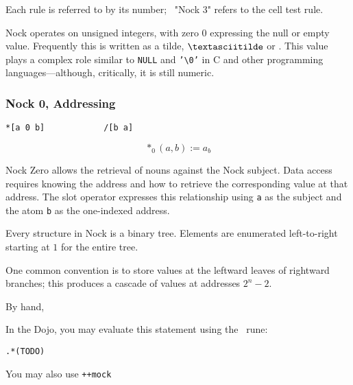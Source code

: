 Each rule is referred to by its number; \eg~"Nock 3" refers to the cell test rule.

Nock operates on unsigned integers, with zero $0$ expressing the null or empty value.  Frequently this is written as a tilde, $\textasciitilde$ or \nullchr.  This value plays a complex role similar to \texttt{NULL} and \texttt{'\textbackslash 0'} in C and other programming languages—although, critically, it is still numeric.

\subsubsection[Nock 0]{Nock 0, Addressing}

\begin{lstlisting}[style=nonumbers]
*[a 0 b]            /[b a]
\end{lstlisting}

$$
*_{0}(a,b) := a_{b}
$$

Nock Zero allows the retrieval of nouns against the Nock subject.  Data access requires knowing the address and how to retrieve the corresponding value at that address.  The slot operator expresses this relationship using \texttt{a} as the subject and the atom \texttt{b} as the one-indexed address.

Every structure in Nock is a binary tree.  Elements are enumerated left-to-right starting at $1$ for the entire tree.


One common convention is to store values at the leftward leaves of rightward branches; this produces a cascade of values at addresses $2^{n}-2$.





By hand,



In the Dojo, you may evaluate this statement using the \pdottar~rune:

\begin{lstlisting}[style=nonumbers]
.*(TODO)
\end{lstlisting}

You may also use \texttt{++mock}

